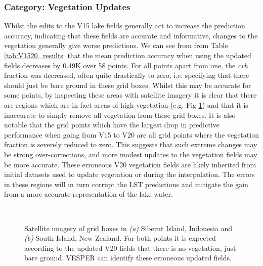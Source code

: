 \documentclass[twocolumn]{article}
\begin{document}
	\subsubsection{Category: Vegetation Updates}\label{V20Vegetation}
	Whilst the edits to the V15 lake fields generally act to increase the prediction accuracy, indicating that these fields are accurate and informative, changes to the vegetation generally give worse predictions. We can see from from Table \ref{tab:V1520_results} that the mean prediction accuracy when using the updated fields decreases by 0.49K over 58 points. For all points apart from one, the \textit{cvh} fraction was decreased, often quite drastically to zero, i.e. specifying that there should just be bare ground in these grid boxes. Whilst this may be accurate for some points, by inspecting these areas with satellite imagery it is clear that there are regions which are in fact areas of high vegetation (e.g. Fig \ref{fig:cvh}) and that it is inaccurate to simply remove all vegetation from these grid boxes. It is also notable that the  grid points which have the largest drop in predictive performance when going from V15 to V20 are all grid points where the vegetation fraction is severely reduced to zero. This suggests that such extreme changes may be strong over-corrections, and more modest updates to the vegetation fields may be more accurate. These erroneous V20 vegetation fields are likely inherited from  initial datasets used to update vegetation or during the interpolation. The errors in these regions will in turn corrupt the LST predictions and mitigate the gain from a more accurate representation of the lake water.
	\begin{figure}[h!]
		 \\
		\caption{Satellite imagery of grid boxes in \textit{(a)} Siberut Island, Indonesia  and \textit{(b)} South Island, New Zealand. For both points it is expected according to the updated V20 fields that there is no vegetation, just bare ground. VESPER can identify these erroneous updated fields.} 
		\label{fig:cvh}
	\end{figure}
	
\end{document}
